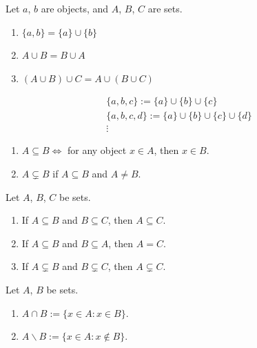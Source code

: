 \documentclass{article}
\begin{document}
\begin{lemma}
    Let $a$, $b$ are objects, and $A$, $B$, $C$ are sets.
    \begin{enumerate}
        \item $\{a,b\}=\{a\}\cup\{b\}$
        \item $A \cup B = B \cup A$
        \item $(A \cup B) \cup C = A \cup (B \cup C)$
    \end{enumerate}
\end{lemma}

\begin{definition}
    \begin{gather*}
        \{a,b,c\} := \{a\}\cup\{b\}\cup\{c\} \\
        \{a,b,c,d\} := \{a\}\cup\{b\}\cup\{c\}\cup\{d\} \\
        \vdots
    \end{gather*}
\end{definition}

\begin{definition}[Subsets]
    \begin{enumerate}
        \item $A \subseteq B \Leftrightarrow$ for any object $x \in A$, then $x \in B$.
        \item $A \subsetneq B$ if $A \subseteq B$ and $A \neq B$.
    \end{enumerate}
\end{definition}

\begin{proposition}
    Let $A$, $B$, $C$ be sets.
    \begin{enumerate}
        \item If $A \subseteq B$ and $B \subseteq C$, then $A \subseteq C$.
        \item If $A \subseteq B$ and $B \subseteq A$, then $A = C$.
        \item If $A \subsetneq B$ and $B \subsetneq C$, then $A \subsetneq C$.
    \end{enumerate}
\end{proposition}

\begin{definition}
    Let $A$, $B$ be sets.
    \begin{enumerate}
        \item $A \cap B := \{x \in A : x \in B\}$.
        \item $A \backslash B := \{x \in A : x \notin B\}$.
    \end{enumerate}
\end{definition}
\end{document}
